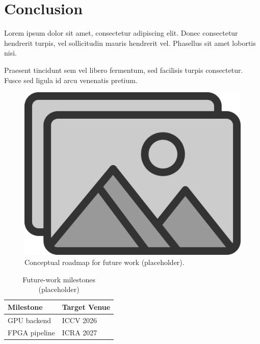 \section{Conclusion}
Lorem ipsum dolor sit amet, consectetur adipiscing elit. Donec consectetur
hendrerit turpis, vel sollicitudin mauris hendrerit vel. Phasellus sit amet
lobortis nisi.

Praesent tincidunt sem vel libero fermentum, sed facilisis turpis consectetur.
Fusce sed ligula id arcu venenatis pretium.

\begin{figure}[t]
  \centering
  \includegraphics[width=0.85\linewidth]{figs/placeholder}
  \caption{Conceptual roadmap for future work (placeholder).}
  \label{fig:conclusion_future}
\end{figure}

\begin{table}[b]
  \caption{Future-work milestones (placeholder)}
  \label{tab:conclusion_future}
  \centering
  \begin{tabular}{@{}ll@{}}
    \toprule
    Milestone & Target Venue \\ \midrule
    GPU backend & ICCV 2026 \\
    FPGA pipeline & ICRA 2027 \\ \bottomrule
  \end{tabular}
\end{table}
